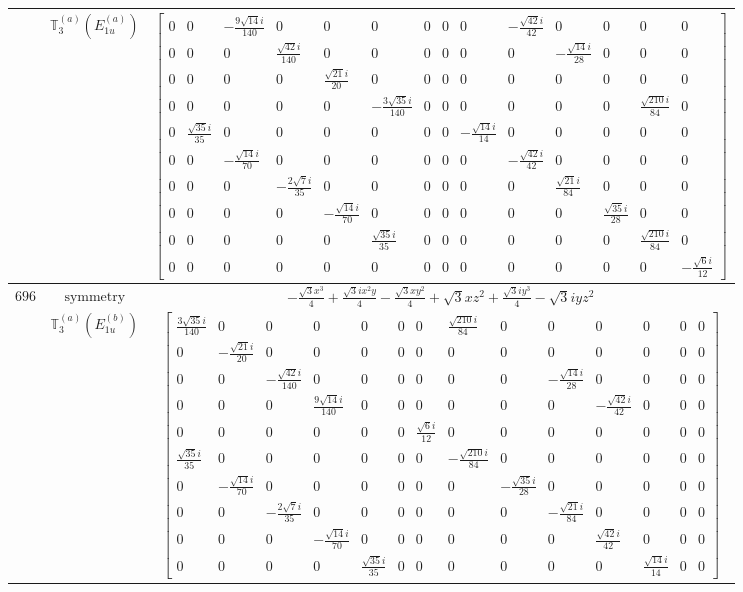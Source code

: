\documentclass[fleqn,8pt,landscape]{jsarticle}
\begin{document}
\begin{longtable}{ccc}
$  $ & $ \mathbb{T}_{3}^{(a)}(E_{1u}^{(a)}) $ & $ \begin{bmatrix} 0 & 0 & - \frac{9 \sqrt{14} i}{140} & 0 & 0 & 0 & 0 & 0 & 0 & - \frac{\sqrt{42} i}{42} & 0 & 0 & 0 & 0 \\ 0 & 0 & 0 & \frac{\sqrt{42} i}{140} & 0 & 0 & 0 & 0 & 0 & 0 & - \frac{\sqrt{14} i}{28} & 0 & 0 & 0 \\ 0 & 0 & 0 & 0 & \frac{\sqrt{21} i}{20} & 0 & 0 & 0 & 0 & 0 & 0 & 0 & 0 & 0 \\ 0 & 0 & 0 & 0 & 0 & - \frac{3 \sqrt{35} i}{140} & 0 & 0 & 0 & 0 & 0 & 0 & \frac{\sqrt{210} i}{84} & 0 \\ 0 & \frac{\sqrt{35} i}{35} & 0 & 0 & 0 & 0 & 0 & 0 & - \frac{\sqrt{14} i}{14} & 0 & 0 & 0 & 0 & 0 \\ 0 & 0 & - \frac{\sqrt{14} i}{70} & 0 & 0 & 0 & 0 & 0 & 0 & - \frac{\sqrt{42} i}{42} & 0 & 0 & 0 & 0 \\ 0 & 0 & 0 & - \frac{2 \sqrt{7} i}{35} & 0 & 0 & 0 & 0 & 0 & 0 & \frac{\sqrt{21} i}{84} & 0 & 0 & 0 \\ 0 & 0 & 0 & 0 & - \frac{\sqrt{14} i}{70} & 0 & 0 & 0 & 0 & 0 & 0 & \frac{\sqrt{35} i}{28} & 0 & 0 \\ 0 & 0 & 0 & 0 & 0 & \frac{\sqrt{35} i}{35} & 0 & 0 & 0 & 0 & 0 & 0 & \frac{\sqrt{210} i}{84} & 0 \\ 0 & 0 & 0 & 0 & 0 & 0 & 0 & 0 & 0 & 0 & 0 & 0 & 0 & - \frac{\sqrt{6} i}{12} \end{bmatrix} $ \\ \hline
$ 696 $ & $ \text{symmetry} $ & $ - \frac{\sqrt{3} x^{3}}{4} + \frac{\sqrt{3} i x^{2} y}{4} - \frac{\sqrt{3} x y^{2}}{4} + \sqrt{3} x z^{2} + \frac{\sqrt{3} i y^{3}}{4} - \sqrt{3} i y z^{2} $ \\
$  $ & $ \mathbb{T}_{3}^{(a)}(E_{1u}^{(b)}) $ & $ \begin{bmatrix} \frac{3 \sqrt{35} i}{140} & 0 & 0 & 0 & 0 & 0 & 0 & \frac{\sqrt{210} i}{84} & 0 & 0 & 0 & 0 & 0 & 0 \\ 0 & - \frac{\sqrt{21} i}{20} & 0 & 0 & 0 & 0 & 0 & 0 & 0 & 0 & 0 & 0 & 0 & 0 \\ 0 & 0 & - \frac{\sqrt{42} i}{140} & 0 & 0 & 0 & 0 & 0 & 0 & - \frac{\sqrt{14} i}{28} & 0 & 0 & 0 & 0 \\ 0 & 0 & 0 & \frac{9 \sqrt{14} i}{140} & 0 & 0 & 0 & 0 & 0 & 0 & - \frac{\sqrt{42} i}{42} & 0 & 0 & 0 \\ 0 & 0 & 0 & 0 & 0 & 0 & \frac{\sqrt{6} i}{12} & 0 & 0 & 0 & 0 & 0 & 0 & 0 \\ \frac{\sqrt{35} i}{35} & 0 & 0 & 0 & 0 & 0 & 0 & - \frac{\sqrt{210} i}{84} & 0 & 0 & 0 & 0 & 0 & 0 \\ 0 & - \frac{\sqrt{14} i}{70} & 0 & 0 & 0 & 0 & 0 & 0 & - \frac{\sqrt{35} i}{28} & 0 & 0 & 0 & 0 & 0 \\ 0 & 0 & - \frac{2 \sqrt{7} i}{35} & 0 & 0 & 0 & 0 & 0 & 0 & - \frac{\sqrt{21} i}{84} & 0 & 0 & 0 & 0 \\ 0 & 0 & 0 & - \frac{\sqrt{14} i}{70} & 0 & 0 & 0 & 0 & 0 & 0 & \frac{\sqrt{42} i}{42} & 0 & 0 & 0 \\ 0 & 0 & 0 & 0 & \frac{\sqrt{35} i}{35} & 0 & 0 & 0 & 0 & 0 & 0 & \frac{\sqrt{14} i}{14} & 0 & 0 \end{bmatrix} $ \\ \hline

\end{longtable}
\end{document}
